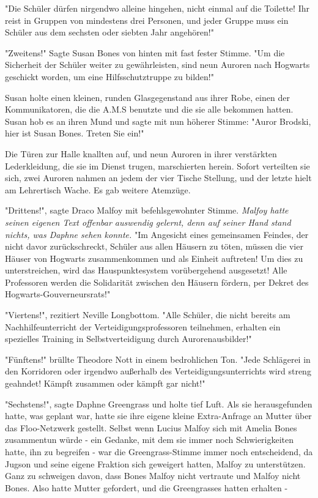 {"Die Schüler dürfen nirgendwo alleine hingehen, nicht einmal auf die Toilette! Ihr reist in Gruppen von mindestens drei Personen, und jeder Gruppe muss ein Schüler aus dem sechsten oder siebten Jahr angehören!"

"Zweitens!" Sagte Susan Bones von hinten mit fast fester Stimme. "Um die Sicherheit der Schüler weiter zu gewährleisten, sind neun Auroren nach Hogwarts geschickt worden, um eine Hilfsschutztruppe zu bilden!"

Susan holte einen kleinen, runden Glasgegenstand aus ihrer Robe, einen der Kommunikatoren, die die A.M.S benutzte und die sie alle bekommen hatten. Susan hob es an ihren Mund und sagte mit nun höherer Stimme: "Auror Brodski, hier ist Susan Bones. Treten Sie ein!"

Die Türen zur Halle knallten auf, und neun Auroren in ihrer verstärkten Lederkleidung, die sie im Dienst trugen, marschierten herein. Sofort verteilten sie sich, zwei Auroren nahmen an jedem der vier Tische Stellung, und der letzte hielt am Lehrertisch Wache. Es gab weitere Atemzüge.

"Drittens!", sagte Draco Malfoy mit befehlsgewohnter Stimme. \emph{Malfoy hatte seinen eigenen Text offenbar auswendig gelernt, denn auf seiner Hand stand nichts, was Daphne sehen konnte.} "Im Angesicht eines gemeinsamen Feindes, der nicht davor zurückschreckt, Schüler aus allen Häusern zu töten, müssen die vier Häuser von Hogwarts zusammenkommen und als Einheit auftreten! Um dies zu unterstreichen, wird das Hauspunktesystem vorübergehend ausgesetzt! Alle Professoren werden die Solidarität zwischen den Häusern fördern, per Dekret des Hogwarts-Gouverneursrats!"

"Viertens!", rezitiert Neville Longbottom. "Alle Schüler, die nicht bereits am Nachhilfeunterricht der Verteidigungsprofessoren teilnehmen, erhalten ein spezielles Training in Selbstverteidigung durch Aurorenausbilder!"

"Fünftens!" brüllte Theodore Nott in einem bedrohlichen Ton. "Jede Schlägerei in den Korridoren oder irgendwo außerhalb des Verteidigungsunterrichts wird streng geahndet! Kämpft zusammen oder kämpft gar nicht!"

"Sechstens!", sagte Daphne Greengrass und holte tief Luft. Als sie herausgefunden hatte, was geplant war, hatte sie ihre eigene kleine Extra-Anfrage an Mutter über das Floo-Netzwerk gestellt. Selbst wenn Lucius Malfoy sich mit Amelia Bones zusammentun würde - ein Gedanke, mit dem sie immer noch Schwierigkeiten hatte, ihn zu begreifen - war die Greengrass-Stimme immer noch entscheidend, da Jugson und seine eigene Fraktion sich geweigert hatten, Malfoy zu unterstützen. Ganz zu schweigen davon, dass Bones Malfoy nicht vertraute und Malfoy nicht Bones. Also hatte Mutter gefordert, und die Greengrasses hatten erhalten -

}
